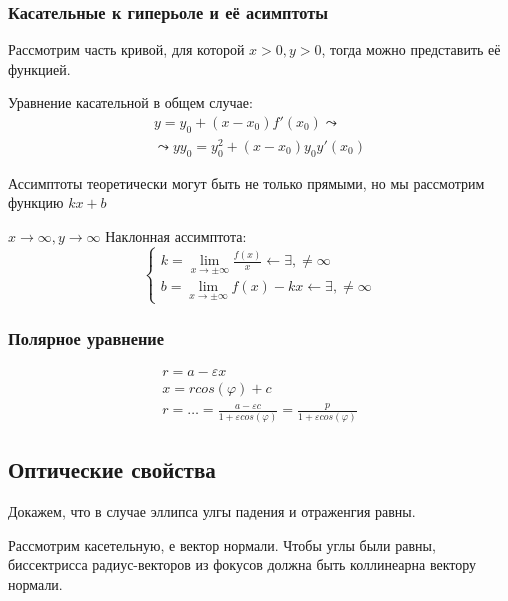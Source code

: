 \documentclass[12pt, a4paper]{article}
\begin{document}
    \subsubsection{Касательные к гиперьоле и её асимптоты}

    Рассмотрим часть кривой, для которой $x > 0, y > 0$, тогда можно представить её функцией.

    Уравнение касательной в общем случае:
    \begin{multline}
        y = y_0 + (x - x_0) f'(x_0) \leadsto \\
        \leadsto yy_0 = y_0^2 + (x - x_0) y_0 y'(x_0)
    \end{multline}

    \begin{note}
        Ассимптоты теоретически могут быть не только прямыми, но мы рассмотрим функцию $kx + b$ 
    \end{note}

    $x \to \infty, y \to \infty$
    Наклонная ассимптота:
    \begin{equation}
        \begin{cases}
            k = \lim_{x \to \pm\infty} \frac{f(x)}{x} \longleftarrow \exists, \neq \infty \\
            b = \lim_{x \to \pm\infty} f(x) - kx \longleftarrow \exists, \neq \infty
        \end{cases}
    \end{equation}


    \subsubsection{Полярное уравнение}

    \begin{gather}
        r = a - \varepsilon x \\
        x = r cos(\varphi) + c \\
        r = \dots = \frac{a - \varepsilon c}{1 + \varepsilon cos (\varphi)} = \frac{p}{1 + \varepsilon cos (\varphi)}
    \end{gather}


    \subsection{Оптические свойства}

    Докажем, что в случае эллипса улгы падения и отраженгия равны.

    Рассмотрим касетельную, е вектор нормали.
    Чтобы углы были равны, биссектрисса радиус-векторов из фокусов должна быть коллинеарна вектору нормали.
    
\end{document}
